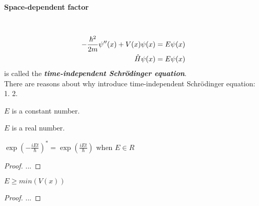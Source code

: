 \paragraph{Space-dependent factor }~{}
\begin{align}
    -\frac{\hbar^{2}}{2 m} \psi^{\prime \prime}(x)+V(x) \psi(x)&=E \psi(x)\notag\\
    \hat{H} \psi(x) & = E\psi(x) \label{eq11}
\end{align}
 is called the \textbf{\emph{time-independent Schrödinger equation}}.\\
There are reasons about why introduce time-independent Schrödinger equation:
1. 
2. 

\begin{remark}
    $E$ is a constant number.
\end{remark}

\begin{remark}
    $E$ is a real number.
\end{remark}
\begin{remark}
    $ \exp(-\frac{iEt}{\hbar})^* = \exp(\frac{iEt}{\hbar})$ when $E \in R $ 
\end{remark}

\begin{proof}
    ...
\end{proof}
\begin{remark}
    $E \geq min(V(x))$
\end{remark}
\begin{proof}
    ...
\end{proof}
